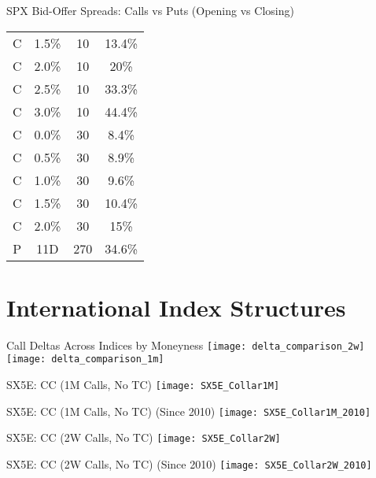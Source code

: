 \documentclass{beamer}
\begin{document}
\begin{frame}{SPX Bid-Offer Spreads: Calls vs Puts (Opening vs Closing)}
{\begin{tabular}{cccc}
\color{blue}C & \color{blue}1.5\% & 10 & 13.4\%\\
C & 2.0\% & 10 & 20\%\\
C & 2.5\% & 10 & 33.3\%\\
C & 3.0\% & 10 & 44.4\%\\
\midrule
\addlinespace
C & 0.0\% & 30 & 8.4\%\\
C & 0.5\% & 30 & 8.9\%\\
C & 1.0\% & 30 & 9.6\%\\
C & 1.5\% & 30 & 10.4\%\\
\color{blue}C & \color{blue}2.0\% & 30 & 15\%\\
\midrule
\addlinespace
\color{blue}P & \color{blue}11D & 270 & 34.6\%\\
\bottomrule
\end{tabular}
}
\end{frame}

\section{International Index Structures}

\begin{frame}{Call Deltas Across Indices by Moneyness}
\texttt{[image: delta\_comparison\_2w]}\\
\texttt{[image: delta\_comparison\_1m]}
\end{frame}

\begin{frame}{SX5E: CC (1M Calls, No TC)}
\texttt{[image: SX5E\_Collar1M]}
\end{frame}

\begin{frame}{SX5E: CC (1M Calls, No TC) (Since 2010)}
\texttt{[image: SX5E\_Collar1M\_2010]}
\end{frame}

\begin{frame}{SX5E: CC (2W Calls, No TC)}
\texttt{[image: SX5E\_Collar2W]}
\end{frame}

\begin{frame}{SX5E: CC (2W Calls, No TC) (Since 2010)}
\texttt{[image: SX5E\_Collar2W\_2010]}
\end{frame}
\end{document}
